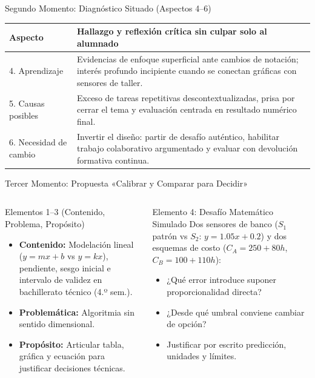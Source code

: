 \documentclass[aspectratio=169,spanish,xcolor=table]{beamer}
\begin{document}
\begin{frame}{Segundo Momento: Diagnóstico Situado (Aspectos 4--6)}
  \scriptsize\renewcommand{\arraystretch}{1.35}
  \begin{tabular}{p{2.7cm}p{10.3cm}}
    \toprule
    \rowcolor{iiiepePale} \textbf{Aspecto} & \textbf{Hallazgo y reflexión crítica sin culpar solo al alumnado} \\
    \midrule
    4. Aprendizaje & Evidencias de enfoque superficial ante cambios de notación; interés profundo incipiente cuando se conectan gráficas con sensores de taller. \\
    5. Causas posibles & Exceso de tareas repetitivas descontextualizadas, prisa por cerrar el tema y evaluación centrada en resultado numérico final. \\
    6. Necesidad de cambio & Invertir el diseño: partir de desafío auténtico, habilitar trabajo colaborativo argumentado y evaluar con devolución formativa continua. \\
    \bottomrule
  \end{tabular}
\end{frame}

\begin{frame}{Tercer Momento: Propuesta «Calibrar y Comparar para Decidir»}
  \begin{columns}[T]
      \begin{block}{Elementos 1--3 (Contenido, Problema, Propósito)}
        \begin{itemize}\scriptsize
          \item \textbf{Contenido:} Modelación lineal ($y=mx+b$ vs $y=kx$), pendiente, sesgo inicial e intervalo de validez en bachillerato técnico (4.º sem.).
          \item \textbf{Problemática:} Algoritmia sin sentido dimensional.
          \item \textbf{Propósito:} Articular tabla, gráfica y ecuación para justificar decisiones técnicas.
        \end{itemize}
      \end{block}
      \begin{block}{Elemento 4: Desafío Matemático Simulado}
        \scriptsize Dos sensores de banco ($S_1$ patrón vs $S_2$: $y=1.05x+0.2$) y dos esquemas de costo ($C_A=250+80h$, $C_B=100+110h$):
        \begin{itemize}\tiny
          \item ¿Qué error introduce suponer proporcionalidad directa?
          \item ¿Desde qué umbral conviene cambiar de opción?
          \item Justificar por escrito predicción, unidades y límites.
        \end{itemize}
      \end{block}
  \end{columns}
\end{frame}
\end{document}

